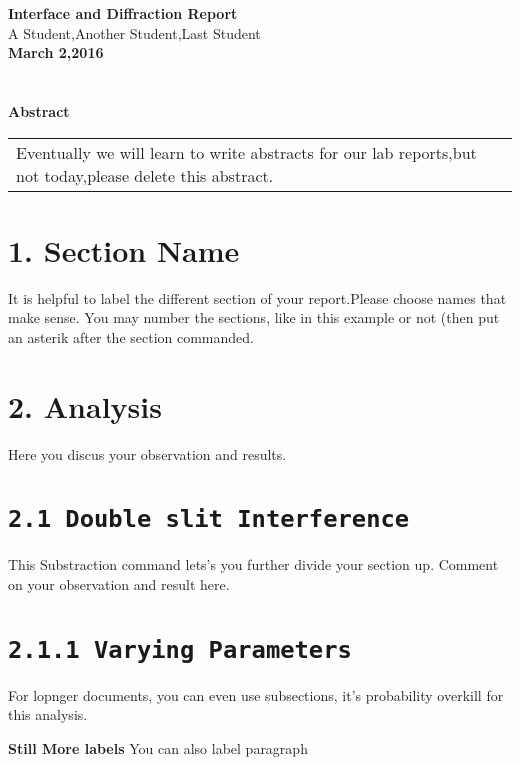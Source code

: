\documentclass[a4paper,10pt]{article}
\begin{document}
 
\pagestyle{empty}
 
\begin{center}
\textbf{\LARGE Interface and Diffraction Report}\\[0.5em]
\textsf{\LARGE A Student,Another Student,Last Student}\\
\textbf{March 2,2016}\\
\end{center}
 
\section*{}
\begin{center}
\textbf{\LARGE Abstract}
\begin{tabular}{l l}
Eventually we will learn to write abstracts for our lab reports,but not today,please delete this abstract.
\end{tabular}
\end{center}
 
\section*{1. Section Name}
It is helpful to label the different section of your report.Please choose names that make sense. You may number the sections, like in this example or not (then put an asterik after the section commanded.
 
\section*{2. Analysis}
Here you discus your observation and results.
 
\section*{\texttt{2.1 Double slit Interference}}
This Substraction command lets's you further divide your section up. Comment on your observation and result here.
 
\section*{\texttt{2.1.1 Varying Parameters}}
For lopnger documents, you can even use subsections, it's probability overkill for this analysis.

\pagestyle{empty}

\textbf{Still More labels} You can also label paragraph
\end{document}
